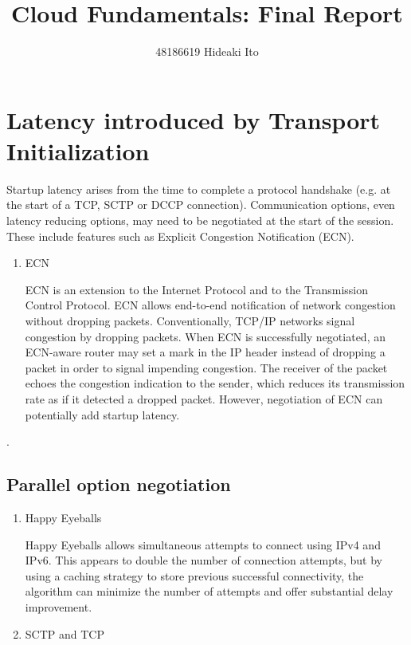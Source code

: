 \documentclass[twocolumn]{preport}
\title{Cloud Fundamentals: Final Report}
\author{48186619 Hideaki Ito}
\begin{document}
\pagestyle{empty}
\maketitle
\thispagestyle{empty}
\sloppy

\section{Latency introduced by Transport Initialization}
Startup latency arises from the time to complete a protocol handshake (e.g. at the start of a TCP, SCTP or DCCP connection).
Communication options, even latency reducing options, may need to be negotiated at the start of the session.
These include features such as Explicit Congestion Notification (ECN).
\begin{enumerate}
\item ECN\par
  ECN is an extension to the Internet Protocol and to the Transmission Control Protocol. ECN allows end-to-end notification of network congestion without dropping packets. Conventionally, TCP/IP networks signal congestion by dropping packets. When ECN is successfully negotiated, an ECN-aware router may set a mark in the IP header instead of dropping a packet in order to signal impending congestion. The receiver of the packet echoes the congestion indication to the sender, which reduces its transmission rate as if it detected a dropped packet. However, negotiation of ECN can potentially add startup latency.
\end{enumerate}


.

\subsection{Parallel option negotiation}
\begin{enumerate}
 \item Happy Eyeballs\par
   Happy Eyeballs allows simultaneous attempts to connect using IPv4 and IPv6. This appears to double the number of connection attempts, but by using a caching strategy to store previous successful connectivity, the algorithm can minimize the number of attempts and offer substantial delay improvement.
 \item SCTP and TCP
\end{enumerate}
\end{document}
